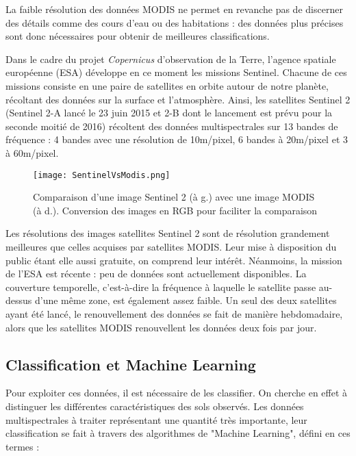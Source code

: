 La faible résolution des données MODIS ne permet en revanche pas de discerner des détails comme des cours d'eau ou des habitations : des données plus précises sont donc nécessaires pour obtenir de meilleures classifications. 

Dans le cadre du projet \textit{Copernicus} d'observation de la Terre, l'agence spatiale européenne (ESA) développe en ce moment les missions Sentinel. Chacune de ces missions consiste en une paire de satellites en orbite autour de notre planète, récoltant des données sur la surface et l'atmosphère. Ainsi, les satellites Sentinel 2 (Sentinel 2-A lancé le 23 juin 2015 et 2-B dont le lancement est prévu pour la seconde moitié de 2016)\cite{sent2} récoltent des données multispectrales sur 13 bandes de fréquence : 4 bandes avec une résolution de 10m/pixel, 6 bandes à 20m/pixel et 3 à 60m/pixel.

\begin{figure}[H]
  \centering
    \texttt{[image: SentinelVsModis.png]}
  \caption{Comparaison d'une image Sentinel 2 (à g.) avec une image MODIS (à d.). Conversion des images en RGB pour faciliter la comparaison}
  \label{fig:SentinelVsModis}
\end{figure}

Les résolutions des images satellites Sentinel 2 sont de résolution grandement meilleures que celles acquises par satellites MODIS. Leur mise à disposition du public étant elle aussi gratuite, on comprend leur intérêt. 
Néanmoins, la mission de l'ESA est récente : peu de données sont actuellement disponibles. La couverture temporelle, c'est-à-dire la fréquence à laquelle le satellite passe au-dessus d'une même zone, est également assez faible. Un seul des deux satellites ayant été lancé, le renouvellement des données se fait de manière hebdomadaire, alors que les satellites MODIS renouvellent les données deux fois par jour. 

\subsection{Classification et Machine Learning}

Pour exploiter ces données, il est nécessaire de les classifier. On cherche en effet à distinguer les différentes caractéristiques des sols observés. Les données multispectrales à traiter représentant une quantité très importante, leur classification se fait à travers des algorithmes de "Machine Learning", défini en ces termes : 

